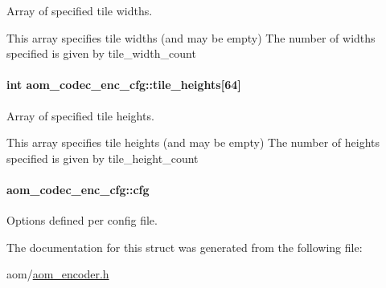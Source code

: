 Array of specified tile widths. 

This array specifies tile widths (and may be empty) The number of widths specified is given by tile\+\_\+width\+\_\+count 
\paragraph[{\texorpdfstring{tile\+\_\+heights}{tile_heights}}]{\setlength{\rightskip}{0pt plus 5cm}int aom\+\_\+codec\+\_\+enc\+\_\+cfg\+::tile\+\_\+heights\mbox{[}64\mbox{]}}\hypertarget{structaom__codec__enc__cfg_a7859761b70f5a44005dfd776e7c2f79d}{}\label{structaom__codec__enc__cfg_a7859761b70f5a44005dfd776e7c2f79d}


Array of specified tile heights. 

This array specifies tile heights (and may be empty) The number of heights specified is given by tile\+\_\+height\+\_\+count 
\paragraph[{\texorpdfstring{cfg}{cfg}}]{ aom\+\_\+codec\+\_\+enc\+\_\+cfg\+::cfg}\hypertarget{structaom__codec__enc__cfg_a91c4b8e91211a9cea98a8003ef2e4e65}{}\label{structaom__codec__enc__cfg_a91c4b8e91211a9cea98a8003ef2e4e65}


Options defined per config file. 



The documentation for this struct was generated from the following file\+:\begin{DoxyCompactItemize}
\item 
aom/\hyperlink{aom__encoder_8h}{aom\+\_\+encoder.\+h}\end{DoxyCompactItemize}
